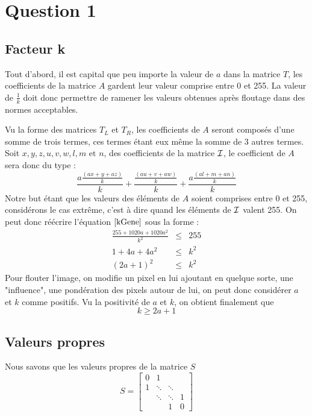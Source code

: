 \section{Question 1}

\subsection{Facteur k}
Tout d'abord, il  est capital que peu importe la valeur de $\textit{a}$ dans la matrice $\textit{T}$,
les coefficients de la matrice $\textit{A}$ gardent leur valeur comprise entre 0 et 255.
La valeur de $\frac{1}{k}$ doit donc permettre de ramener les valeurs obtenues après floutage dans des normes acceptables.

Vu la forme des matrices $T_L$ et $T_R$, les coefficients de $A$ seront composés
d'une somme de trois termes,
ces termes étant eux même la somme de 3 autres termes.
Soit $x,y,z, u, v, w, l, m \text{ et } n$, des coefficients de la matrice $\mathcal{I}$,
le coefficient de $A$ sera donc du type :
\begin{equation} \label{kGene}
  \frac{a \frac{(ax+y+az)}{k}}{k} + \frac{\frac{(au+v+aw)}{k}}{k} + \frac{a \frac{(al+m+an)}{k}}{k}
\end{equation}
Notre but étant que les valeurs des éléments de $A$	soient comprises entre 0 et 255, 
considérons le cas extrême,
c'est à dire quand les éléments de $\mathcal{I}$ valent 255.
On peut donc réécrire l'équation $\ref{kGene}$ sous la forme :
\begin{eqnarray}
\frac{255+1020a+1020a^2}{k^2} &\leq & 255 \\
1+4a+4a^2 &\leq & k^2 \\
(2a+1)^2 &\leq & k^2
\end{eqnarray}
Pour flouter l'image, on modifie un pixel en lui ajoutant en quelque sorte, une "influence", une pondération des pixels autour de lui, on peut donc considérer $a$ et $k$ comme positifs.  
Vu la positivité de $a$ et $k$, on obtient finalement que
\begin{equation}
k \geq 2a+1
\end{equation}


\subsection{Valeurs propres}
Nous savons que les valeurs propres de la matrice $S$
$$
S =
 \begin{bmatrix}
    0 & 1 		& 			& \\
    1 & \ddots 	& \ddots 	& \\
      & \ddots 	& \ddots 	& 1 \\
      & 		& 1			& 0
  \end{bmatrix}
$$


